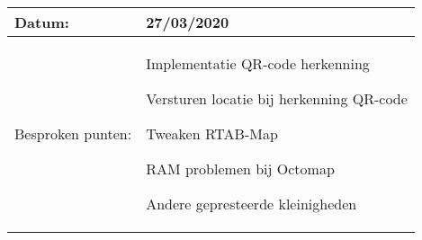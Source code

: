 \begin{tabularx}{\textwidth}{| l | X |}
    \hline
    Datum: & 27/03/2020\\
    \hline
    Besproken punten: &
    \begin{compactitem}
      \item Implementatie QR-code herkenning
      \item Versturen locatie bij herkenning QR-code
      \item Tweaken RTAB-Map
      \item RAM problemen bij Octomap
      \item Andere gepresteerde kleinigheden
    \end{compactitem}\\
    \hline
  \end{tabularx}